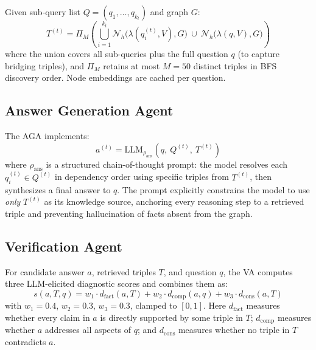 \documentclass[runningheads]{llncs}
\newcommand{\calN}{\mathcal{N}}
\begin{document}
\begin{definition}
Given sub-query list $Q=(q_1,\ldots,q_{k_t})$ and graph $G$:
\begin{equation}
  T^{(t)} = \Pi_M\!\left(
    \bigcup_{i=1}^{k_t}\calN_h\!\bigl(\lambda(q_i^{(t)},V),G\bigr)
    \ \cup\ \calN_h\!\bigl(\lambda(q,V),G\bigr)
  \right)
  \label{eq:retrieval}
\end{equation}
where the union covers all sub-queries plus the full question $q$ (to capture
bridging triples), and $\Pi_M$ retains at most $M=50$ distinct triples in BFS
discovery order. Node embeddings are cached per question.
\end{definition}

\subsection{Answer Generation Agent}

The AGA implements:
\begin{equation}
  a^{(t)} = \mathrm{LLM}_{\rho_\text{ans}}\!\left(q,\ Q^{(t)},\ T^{(t)}\right)
  \label{eq:aga}
\end{equation}
where $\rho_\text{ans}$ is a structured chain-of-thought prompt: the model
resolves each $q_i^{(t)}\in Q^{(t)}$ in dependency order using specific
triples from $T^{(t)}$, then synthesizes a final answer to $q$. The prompt
explicitly constrains the model to use \emph{only} $T^{(t)}$ as its knowledge
source, anchoring every reasoning step to a retrieved triple and preventing
hallucination of facts absent from the graph.

\subsection{Verification Agent}

\begin{definition}
For candidate answer $a$, retrieved triples $T$, and question $q$, the VA
computes three LLM-elicited diagnostic scores and combines them as:
\begin{equation}
  s(a,T,q) = w_1\cdot d_\text{fact}(a,T) + w_2\cdot d_\text{comp}(a,q)
            + w_3\cdot d_\text{cons}(a,T)
  \label{eq:score}
\end{equation}
with $w_1=0.4$, $w_2=0.3$, $w_3=0.3$, clamped to $[0,1]$.
Here $d_\text{fact}$ measures whether every claim in $a$ is directly supported
by some triple in $T$; $d_\text{comp}$ measures whether $a$ addresses all
aspects of $q$; and $d_\text{cons}$ measures whether no triple in $T$
contradicts $a$.
\end{definition}
\end{document}
